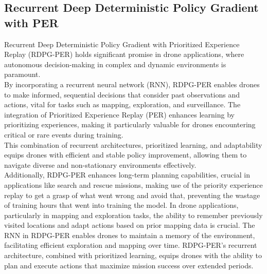 \documentclass[preprint,12pt]{elsarticle}
\begin{document}
\subsection{Recurrent Deep Deterministic Policy Gradient with PER}
Recurrent Deep Deterministic Policy Gradient with Prioritized Experience Replay (RDPG-PER) holds significant promise in drone applications, where autonomous decision-making in complex and dynamic environments is paramount.\\

By incorporating a recurrent neural network (RNN), RDPG-PER enables drones to make informed, sequential decisions that consider past observations and actions, vital for tasks such as mapping, exploration, and surveillance. The integration of Prioritized Experience Replay (PER) enhances learning by prioritizing experiences, making it particularly valuable for drones encountering critical or rare events during training. \\
This combination of recurrent architectures, prioritized learning, and adaptability equips drones with efficient and stable policy improvement, allowing them to navigate diverse and non-stationary environments effectively. \\

Additionally, RDPG-PER enhances long-term planning capabilities, crucial in applications like search and rescue missions, making use of the priority experience replay to get a grasp of what went wrong and avoid that, preventing the wastage of training hours that went into training the model. In drone applications, particularly in mapping and exploration tasks, the ability to remember previously visited locations and adapt actions based on prior mapping data is crucial. The RNN in RDPG-PER enables drones to maintain a memory of the environment, facilitating efficient exploration and mapping over time. RDPG-PER's recurrent architecture, combined with prioritized learning, equips drones with the ability to plan and execute actions that maximize mission success over extended periods. \\
\end{document}
